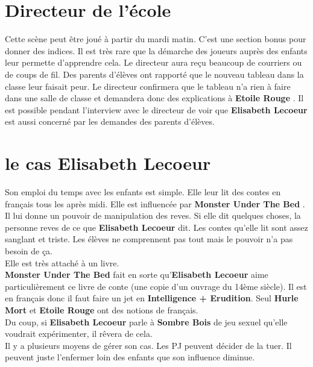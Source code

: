 \documentclass[oneside,12pt]{book}
\newcommand{\Lynn}{\textbf{Etoile Rouge} }
\newcommand{\Peter}{\textbf{Hurle Mort} }
\newcommand{\Leonard}{\textbf{Sombre Bois} }
\newcommand{\Monster}{\textbf{Monster Under The Bed} }
\newcommand{\Elisabeth}{\textbf{Elisabeth Lecoeur} }
\begin{document}
\begin{flushleft}
\section{Directeur de l'école}
Cette scène peut être joué à partir du mardi matin. C'est une section bonus pour donner des indices. Il est très rare que la démarche des joueurs auprès des enfants leur permette d'apprendre cela. 
Le directeur aura reçu beaucoup de courriers ou de coups de fil. Des parents d'élèves ont rapporté que le nouveau tableau dans la classe leur faisait peur. Le directeur confirmera que le tableau n'a rien à faire dans une salle de classe et demandera donc des explications à \Lynn. Il est possible pendant l'interview avec le directeur de voir que \Elisabeth est aussi concerné par les demandes des parents d’élèves.


\section{le cas \Elisabeth}
Son emploi du temps avec les enfants est simple. Elle leur lit des contes en français tous les après midi. Elle est influencée par \Monster . Il lui donne un pouvoir de manipulation des reves. Si elle dit quelques choses, la personne reves de ce que \Elisabeth dit. Les contes qu'elle lit sont assez sanglant et triste. Les élèves ne comprennent pas tout mais le pouvoir n'a pas besoin de ça. \\ 
Elle est très attaché à un livre. \\ 
\Monster fait en sorte qu'\Elisabeth aime particulièrement ce livre de conte (une copie d'un ouvrage du 14ème siècle). Il est en français donc il faut faire un jet en \textbf{Intelligence + Erudition}. Seul \Peter et \Lynn ont des notions de français. \\

Du coup, si \Elisabeth parle à \Leonard de jeu sexuel qu'elle voudrait expérimenter, il rêvera de cela. \\

Il y a plusieurs moyens de gérer son cas. Les PJ peuvent décider de la tuer. Il peuvent juste l'enfermer loin des enfants que son influence diminue. \\ 


\end{flushleft}
\end{document}
